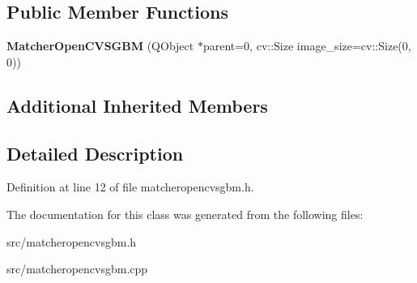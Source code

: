 \subsection*{Public Member Functions}
\begin{DoxyCompactItemize}
\item 
\hypertarget{class_matcher_open_c_v_s_g_b_m_ac6e50ab709cd3a87bde9b47dca8f92f0}{}{\bfseries Matcher\+Open\+C\+V\+S\+G\+B\+M} (Q\+Object $\ast$parent=0, cv\+::\+Size image\+\_\+size=cv\+::\+Size(0, 0))\label{class_matcher_open_c_v_s_g_b_m_ac6e50ab709cd3a87bde9b47dca8f92f0}

\end{DoxyCompactItemize}
\subsection*{Additional Inherited Members}


\subsection{Detailed Description}


Definition at line 12 of file matcheropencvsgbm.\+h.



The documentation for this class was generated from the following files\+:\begin{DoxyCompactItemize}
\item 
src/matcheropencvsgbm.\+h\item 
src/matcheropencvsgbm.\+cpp\end{DoxyCompactItemize}
